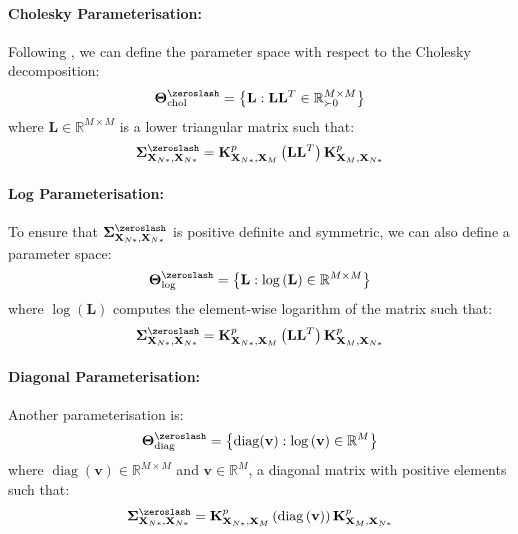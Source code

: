 \documentclass{article}
\newcommand{\diag}{\operatorname{diag}}
\numberwithin{equation}{section}
\begin{document}
\paragraph{Cholesky Parameterisation:}Following \cite{wild2022generalized}, we can define the parameter space with respect to the Cholesky decomposition:
\begin{align}
    \boldsymbol{\Theta}^{\zeroslash}_{\text{chol}} = \left\{\mathbf{L}: \mathbf{L} \mathbf{L}^T \in \mathbb{R}^{M\times M}_{\succ 0}\right\}
\end{align}
where $\mathbf{L} \in \mathbb{R}^{M\times M}$ is a lower triangular matrix such that:
\begin{align}
    \mathbf{\Sigma}^{\zeroslash}_{\mathbf{X}_{N*}, \mathbf{X}_{N*}} = \mathbf{K}^p_{\mathbf{X}_{N*}, \mathbf{X}_M} \left(\mathbf{L} \mathbf{L}^T\right)\mathbf{K}^p_{\mathbf{X}_M, \mathbf{X}_{N*}} 
\end{align}

\paragraph{Log Parameterisation:}To ensure that $\mathbf{\Sigma}^{\zeroslash}_{\mathbf{X}_{N*}, \mathbf{X}_{N*}}$ is positive definite and symmetric, we can also define a parameter space:
\begin{align}
    \boldsymbol{\Theta}^{\zeroslash}_{\text{log}} = \left\{\mathbf{L}: \log\left(\mathbf{L}\right)  \in \mathbb{R}^{M\times M}\right\}
\end{align}
where $\log\left(\mathbf{L}\right)$ computes the element-wise logarithm of the matrix such that:
\begin{align}
    \mathbf{\Sigma}^{\zeroslash}_{\mathbf{X}_{N*}, \mathbf{X}_{N*}} = \mathbf{K}^p_{\mathbf{X}_{N*}, \mathbf{X}_M} \left(\mathbf{L} \mathbf{L}^T\right)\mathbf{K}^p_{\mathbf{X}_M, \mathbf{X}_{N*}} 
    \label{chol-svgp}
\end{align}

\paragraph{Diagonal Parameterisation:}Another parameterisation is:
\begin{align}
    \boldsymbol{\Theta}^{\zeroslash}_{\text{diag}} = \left\{\diag(\mathbf{v}): \log\left(\mathbf{v}\right)  \in \mathbb{R}^{M}\right\}
    \label{log-svgp}
\end{align}
where $\diag(\mathbf{v}) \in \mathbb{R}^{M\times M}$ and $\mathbf{v} \in \mathbb{R}^M$, a diagonal matrix with positive elements such that:
\begin{align}
    \mathbf{\Sigma}^{\zeroslash}_{\mathbf{X}_{N*}, \mathbf{X}_{N*}} = \mathbf{K}^p_{\mathbf{X}_{N*}, \mathbf{X}_M} \left(\diag\left(\mathbf{v}\right)\right)\mathbf{K}^p_{\mathbf{X}_M, \mathbf{X}_{N*}} 
    \label{diagonal-svgp}
\end{align}
\end{document}
